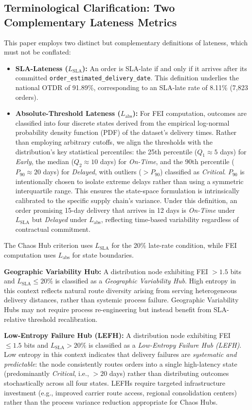 \documentclass[conference]{IEEEtran}
\begin{document}
\subsection{Terminological Clarification: Two Complementary Lateness Metrics}
This paper employs two distinct but complementary definitions of lateness, which must not be conflated:
\begin{itemize}
  \item \textbf{SLA-Lateness ($L_{\text{SLA}}$):} An order is SLA-late if and only if it arrives after its committed \texttt{order\_estimated\_delivery\_date}. This definition underlies the national OTDR of 91.89\%, corresponding to an SLA-late rate of 8.11\% (7,823 orders).
  \item \textbf{Absolute-Threshold Lateness ($L_{\text{abs}}$):} For FEI computation, outcomes are classified into four discrete states derived from the empirical log-normal probability density function (PDF) of the dataset's delivery times. Rather than employing arbitrary cutoffs, we align the thresholds with the distribution's key statistical percentiles: the 25th percentile ($Q_1 \approx 5$ days) for \textit{Early}, the median ($Q_2 \approx 10$ days) for \textit{On-Time}, and the 90th percentile ($P_{90} \approx 20$ days) for \textit{Delayed}, with outliers ($> P_{90}$) classified as \textit{Critical}. $P_{90}$ is intentionally chosen to isolate extreme delays rather than using a symmetric interquartile range. This ensures the state-space formulation is intrinsically calibrated to the specific supply chain's variance. Under this definition, an order promising 15-day delivery that arrives in 12 days is \textit{On-Time} under $L_{\text{SLA}}$ but \textit{Delayed} under $L_{\text{abs}}$, reflecting time-based variability regardless of contractual commitment.
\end{itemize}
The Chaos Hub criterion uses $L_{\text{SLA}}$ for the 20\% late-rate condition, while FEI computation uses $L_{\text{abs}}$ for state boundaries.

\textbf{Geographic Variability Hub:} A distribution node exhibiting FEI $> 1.5$ bits and $L_{\text{SLA}} \leq 20\%$ is classified as a \textit{Geographic Variability Hub}. High entropy in this context reflects natural route diversity arising from serving heterogeneous delivery distances, rather than systemic process failure. Geographic Variability Hubs may not require process re-engineering but instead benefit from SLA-relative threshold recalibration.

\textbf{Low-Entropy Failure Hub (LEFH):} A distribution node exhibiting FEI $\leq 1.5$ bits and $L_{\text{SLA}} > 20\%$ is classified as a \textit{Low-Entropy Failure Hub (LEFH)}. Low entropy in this context indicates that delivery failures are \textit{systematic and predictable}: the node consistently routes orders into a single high-latency state (predominantly \textit{Critical}, i.e., $> 20$ days) rather than distributing outcomes stochastically across all four states. LEFHs require targeted infrastructure investment (e.g., improved carrier route access, regional consolidation centers) rather than the process variance reduction appropriate for Chaos Hubs.
\end{document}
